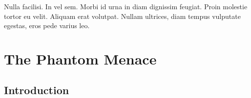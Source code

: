 \graphicspath{{figures/chapter-2/}}


\begin{savequote}[75mm]
Nulla facilisi. In vel sem. Morbi id urna in diam dignissim feugiat. Proin molestie tortor eu velit. Aliquam erat volutpat. Nullam ultrices, diam tempus vulputate egestas, eros pede varius leo.
\end{savequote}

\chapter{The Phantom Menace}


\section{Introduction}

\lipsum[1-4] 
\cite{Lucas1}


